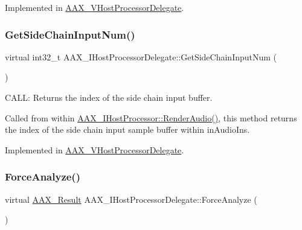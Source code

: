 Implemented in \mbox{\hyperlink{a01921_a030e6742a3aa468a50faccb77329a557}{A\+A\+X\+\_\+\+V\+Host\+Processor\+Delegate}}.

\mbox{\label{a01837_aaf6821f08105fd949aa9e78f3a1f7f50}} 
\subsubsection{\texorpdfstring{GetSideChainInputNum()}{GetSideChainInputNum()}}
{\footnotesize\ttfamily virtual int32\+\_\+t A\+A\+X\+\_\+\+I\+Host\+Processor\+Delegate\+::\+Get\+Side\+Chain\+Input\+Num (\begin{DoxyParamCaption}{ }\end{DoxyParamCaption})\hspace{0.3cm}{\ttfamily [pure virtual]}}



C\+A\+LL\+: Returns the index of the side chain input buffer. 

Called from within \mbox{\hyperlink{a01693_a29f1352c77cdcce8dbac4d32f1a88887}{A\+A\+X\+\_\+\+I\+Host\+Processor\+::\+Render\+Audio()}}, this method returns the index of the side chain input sample buffer within {\ttfamily in\+Audio\+Ins}. 

Implemented in \mbox{\hyperlink{a01921_a31d793b6a43eb642446f6149621bcdf9}{A\+A\+X\+\_\+\+V\+Host\+Processor\+Delegate}}.

\mbox{\label{a01837_a8ab521c8f0902707a8e8d67d7886d4f4}} 
\subsubsection{\texorpdfstring{ForceAnalyze()}{ForceAnalyze()}}
{\footnotesize\ttfamily virtual \mbox{\hyperlink{a00392_a4d8f69a697df7f70c3a8e9b8ee130d2f}{A\+A\+X\+\_\+\+Result}} A\+A\+X\+\_\+\+I\+Host\+Processor\+Delegate\+::\+Force\+Analyze (\begin{DoxyParamCaption}{ }\end{DoxyParamCaption})\hspace{0.3cm}{\ttfamily [pure virtual]}}



